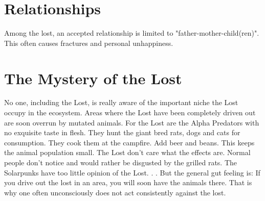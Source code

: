 \section{Relationships}
Among the lost, an accepted relationship is limited to "father-mother-child(ren)". This often causes fractures and personal unhappiness.

\section{The Mystery of the Lost}
No one, including the Lost, is really aware of the important niche the Lost occupy in the ecosystem. Areas where the Lost have been completely driven out are soon overrun by mutated animals.
For the Lost are the Alpha Predators with no exquisite taste in flesh. They hunt the giant bred rats, dogs and cats for consumption. They cook them at the campfire. Add beer and beans.
This keeps the animal population small. The Lost don't care what the effects are. Normal people don't notice and would rather be disgusted by the grilled rats. The Solarpunks have too little opinion of the Lost. . .
But the general gut feeling is: If you drive out the lost in an area, you will soon have the animals there.
That is why one often unconsciously does not act consistently against the lost.